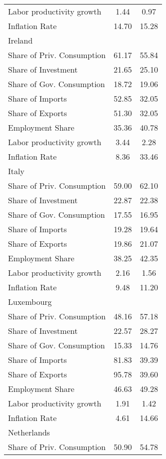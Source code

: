 \begin{center}
\begin{longtable}{lcc}
Labor productivity growth &      1.44 &      0.97 \\  
Inflation Rate &     14.70 &     15.28 \\  
Ireland &  &  \\  
Share of Priv. Consumption &     61.17 &     55.84 \\  
Share of Investment &     21.65 &     25.10 \\  
Share of Gov. Consumption &     18.72 &     19.06 \\  
Share of Imports &     52.85 &     32.05 \\  
Share of Exports &     51.30 &     32.05 \\  
Employment Share &     35.36 &     40.78 \\  
Labor productivity growth &      3.44 &      2.28 \\  
Inflation Rate &      8.36 &     33.46 \\  
Italy &  &  \\  
Share of Priv. Consumption &     59.00 &     62.10 \\  
Share of Investment &     22.87 &     22.38 \\  
Share of Gov. Consumption &     17.55 &     16.95 \\  
Share of Imports &     19.28 &     19.64 \\  
Share of Exports &     19.86 &     21.07 \\  
Employment Share &     38.25 &     42.35 \\  
Labor productivity growth &      2.16 &      1.56 \\  
Inflation Rate &      9.48 &     11.20 \\  
Luxembourg &  &  \\  
Share of Priv. Consumption &     48.16 &     57.18 \\  
Share of Investment &     22.57 &     28.27 \\  
Share of Gov. Consumption &     15.33 &     14.76 \\  
Share of Imports &     81.83 &     39.39 \\  
Share of Exports &     95.78 &     39.60 \\  
Employment Share &     46.63 &     49.28 \\  
Labor productivity growth &      1.91 &      1.42 \\  
Inflation Rate &      4.61 &     14.66 \\  
Netherlands &  &  \\  
Share of Priv. Consumption &     50.90 &     54.78 \\  

\end{longtable}
\end{center}
